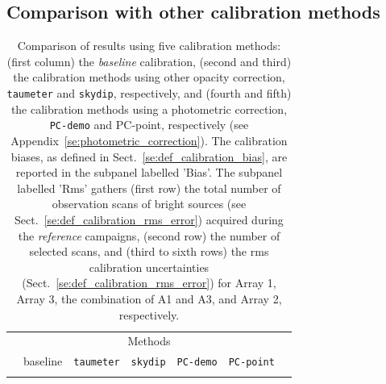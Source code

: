 %
%
\subsection{Comparison with other calibration methods}
\label{se:photometry_others}
\begin{table}[!htbp]
\begin{center}
\caption[Comparison of calibration results using five
  methods]{Comparison of results using five calibration
  methods: (first column) the \emph{baseline} calibration, (second and
  third) the calibration methods using other opacity correction, {\tt
  taumeter} and {\tt skydip}, respectively, and
  (fourth and fifth) the calibration methods using a photometric correction, {\tt
  PC-demo} and {PC-point}, respectively (see Appendix~\ref{se:photometric_correction}).  
  The calibration biases, as defined in
  Sect.~\ref{se:def_calibration_bias}, are reported in the subpanel
  labelled 'Bias'. The subpanel labelled 'Rms' gathers (first row) the total number of
  observation scans of bright sources (see
  Sect.~\ref{se:def_calibration_rms_error}) acquired during
  the \emph{reference} campaigns, (second row) the number of selected
  scans, and (third to sixth rows) the rms calibration uncertainties
  (Sect.~\ref{se:def_calibration_rms_error}) for Array 1, Array 3, the
  combination of A1 and A3, and Array 2, respectively. }
\label{tab:Calibration_results_all}
\begin{tabular}{clrrrrr}
  \hline\hline
  \noalign{\smallskip}
  \multicolumn{2}{c}{}  &  \multicolumn{5}{c}{Methods} \\\cline{3-7}
  \noalign{\smallskip}
  \multicolumn{2}{c}{Characteristics} &  baseline  & {\small {\tt taumeter}}  & {\small {\tt skydip}}  &  {\small {\tt PC-demo}} & {\small {\tt PC-point}} \\
  \hline
  \noalign{\smallskip}

\end{tabular}
\end{center}
\end{table}
